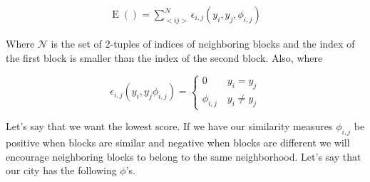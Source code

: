 \documentclass[12pt,draft,letter]{article}
\begin{document}
\begin{align}
\operatorname{E}() = \sum_{<i j>}^{\mathcal{N}}\epsilon_{i,j}(y_i,y_j,\phi_{i,j})
\end{align}

Where $\mathcal{N}$ is the set of 2-tuples of indices of neighboring
blocks and the index of the first block is smaller than the index of
the second block. Also, where

\begin{equation}
\epsilon_{i,j}(y_i,y_j\phi_{i,j}) = \begin{cases}
  0 \quad\quad y_i = y_j \\
  \phi_{i,j} \quad y_i \neq y_j
\end{cases}
\end{equation}

Let's say that we want the lowest score. If we have our similarity
measures $\phi_{i,j}$ be positive when blocks are similar and negative
when blocks are different we will encourage neighboring blocks to
belong to the same neighborhood. Let's say that our city has the
following $\phi$'s.
\end{document}
